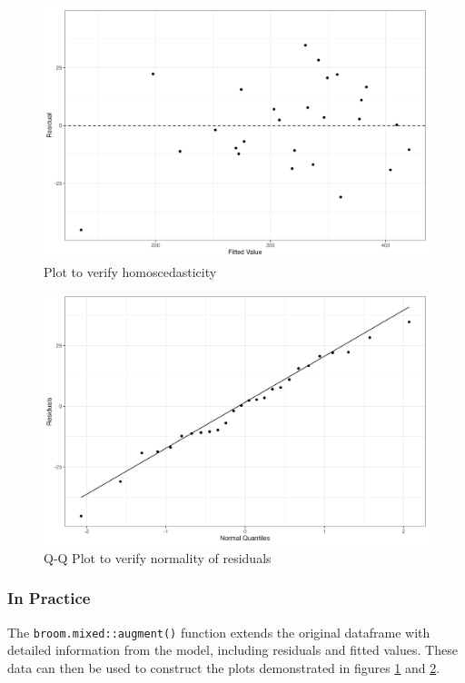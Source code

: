 \documentclass[12pt, TexShade, letterpaper]{report}
\begin{document}
\begin{figure}[H]
    \centering
    \includegraphics[height=0.42\textheight]{report/figures/ch3/homoscedasticity.png}
    \caption{Plot to verify homoscedasticity}
    \label{fig:homoscedasticity}
\end{figure}
\begin{figure}[H]
    \centering
    \includegraphics[height=0.42\textheight]{report/figures/ch3/qqplot.png}
    \caption{Q-Q Plot to verify normality of residuals}
    \label{fig:qqplot}
\end{figure}

\subsubsection{In Practice}
The \texttt{broom.mixed::augment()} function extends the original dataframe with detailed information from the model, including residuals and fitted values. These data can then be used to construct the plots demonstrated in figures \ref{fig:homoscedasticity} and \ref{fig:qqplot}.
\end{document}
